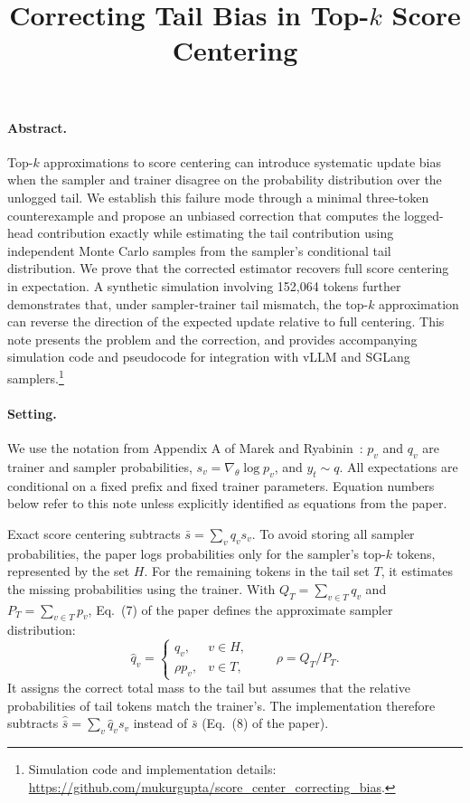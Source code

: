 \documentclass[10pt]{article}
\title{Correcting Tail Bias in Top-\(k\) Score Centering}
\author{}
\date{}
\begin{document}
\maketitle
\vspace{-2.5em}

\paragraph{Abstract.}
Top-$k$ approximations to score centering can introduce systematic update bias when the sampler and trainer disagree on the probability distribution over the unlogged tail. We establish this failure mode through a minimal three-token counterexample and propose an unbiased correction that computes the logged-head contribution exactly while estimating the tail contribution using independent Monte Carlo samples from the sampler's conditional tail distribution. We prove that the corrected estimator recovers full score centering in expectation. A synthetic simulation involving 152,064 tokens further demonstrates that, under sampler-trainer tail mismatch, the top-$k$ approximation can reverse the direction of the expected update relative to full centering. This note presents the problem and the correction, and provides accompanying simulation code and pseudocode for integration with vLLM and SGLang samplers.\footnote{Simulation code and implementation details: \url{https://github.com/mukurgupta/score_center_correcting_bias}.}


\paragraph{Setting.}
We use the notation from Appendix A of Marek and Ryabinin~\cite{marek2026}: $p_v$ and $q_v$ are trainer and sampler probabilities, $s_v=\nabla_\theta\log p_v$, and $y_t\sim q$. All expectations are conditional on a fixed prefix and fixed trainer parameters. Equation numbers below refer to this note unless explicitly identified as equations from the paper.

Exact score centering subtracts $\bar s=\sum_v q_v s_v$. To avoid storing all sampler probabilities, the paper logs probabilities only for the sampler's top-$k$ tokens, represented by the set $H$. For the remaining tokens in the tail set $T$, it estimates the missing probabilities using the trainer. With $Q_T=\sum_{v\in T}q_v$ and $P_T=\sum_{v\in T}p_v$, Eq.~(7) of the paper defines the approximate sampler distribution:
\begin{equation}\label{eq:reconstruction}
 \widehat q_v=\begin{cases}
 q_v,&v\in H,\\
 \rho p_v,&v\in T,
 \end{cases}
 \qquad \rho=Q_T/P_T.
\end{equation}
It assigns the correct total mass to the tail but assumes that the relative probabilities of tail tokens match the trainer's. The implementation therefore subtracts $\widehat{\bar s}=\sum_v\widehat q_v s_v$ instead of $\bar s$ (Eq.~(8) of the paper).
\end{document}

